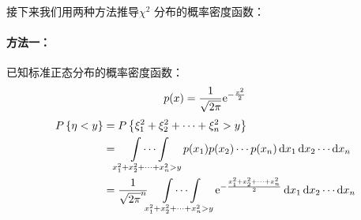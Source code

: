 接下来我们用两种方法推导\(\chi^{2}\) 分布的概率密度函数：
\paragraph{方法一：}
已知标准正态分布的概率密度函数：\[
    p(x) = \frac{1}{\sqrt{2\pi}} \mathrm{e}^{-\frac{x^{2}}{2}}
\]
\begin{align*}
    \P{\eta<y} &= \P{\xi_{1}^{2} + \xi_{2}^{2} + \cdots +
    \xi_{n}^{2} > y} \\
    &= \idotsint\limits_{x_{1}^{2} + x_{2}^{2} + \cdots +
    x_{n}^{2} > y} p(x_{1}) p(x_{2}) \cdots p(x_{n}) \d{x}_{1}
    \d{x}_{2} \cdots \d{x}_{n} \\
    &= \frac{1}{\sqrt{2\pi}^{n}}
    \idotsint\limits_{x_{1}^{2} + x_{2}^{2} + \cdots + x_{n}^{2} > y}
    \e^{-\frac{x_{1}^{2}+ x_{2}^{2} +\dots + x_{n}^{2}}{2}}
    \d{x}_{1} \d{x}_{2} \cdots \d{x}_{n} \\
\end{align*}

